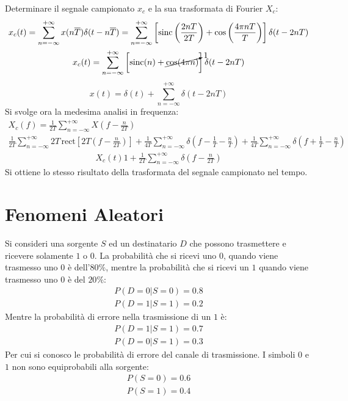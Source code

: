 \documentclass{article}
\newcommand{\rect}{\mbox{rect}}
\newcommand{\sinc}{\mbox{sinc}}
\begin{document}
Determinare il segnale campionato $x_c$ e la sua trasformata di Fourier $X_c$:
\begin{gather*}
    x_c(t)=\displaystyle\sum_{n=-\infty}^{+\infty}x(n\overline{T})\delta(t-n\overline{T})=\sum_{n=-\infty}^{+\infty}\left[\sinc\left(\frac{2nT}{2T}\right)+\cos\left(\frac{4\pi nT}{T}\right)\right]\delta(t-2nT)\\
    x_c(t)=\displaystyle\sum_{n=-\infty}^{+\infty}\left[\sinc(n)+\cancelto{1}{\cos(4\pi n)}\right]\delta(t-2nT)
\end{gather*}
\begin{equation}
    x(t)=\displaystyle\delta(t)+\sum_{n=-\infty}^{+\infty}\delta(t-2nT)
\end{equation}
Si svolge ora la medesima analisi in frequenza:
\begin{gather*}
    X_c(f)=\displaystyle\frac{1}{2T}\sum_{n=-\infty}^{+\infty}X\left(f-\frac{n}{2T}\right)\\
    \displaystyle\frac{1}{2T}\sum_{n=-\infty}^{+\infty}2T\,\rect\left[2T\left(f-\frac{n}{2T}\right)\right]+\frac{1}{4T}\sum_{n=-\infty}^{+\infty}\delta\left(f-\frac{1}{T}-\frac{n}{T}\right)+\frac{1}{4T}\sum_{n=-\infty}^{+\infty}\delta\left(f+\frac{1}{T}-\frac{n}{T}\right)
\end{gather*}
\begin{gather}
    X_c(t)1+\displaystyle\frac{1}{2T}\sum_{n=-\infty}^{+\infty}\delta\left(f-\frac{n}{2T}\right)
\end{gather}
Si ottiene lo stesso risultato della trasformata del segnale campionato nel tempo. 

\clearpage

\section{Fenomeni Aleatori}

Si consideri una sorgente $S$ ed un destinatario $D$ che possono trasmettere e ricevere solamente $1$ o $0$. La probabilità che si ricevi uno $0$, 
quando viene trasmesso uno $0$ è dell'$80\%$, mentre la probabilità che si ricevi un $1$ quando viene trasmesso uno $0$ è del $20\%$:
\begin{gather*}
    P(D=0|S=0)=0.8\\
    P(D=1|S=1)=0.2
\end{gather*}
Mentre la probabilità di errore nella trasmissione di un $1$ è:
\begin{gather*}
    P(D=1|S=1)=0.7\\
    P(D=0|S=1)=0.3
\end{gather*}
Per cui si conosco le probabilità di errore del canale di trasmissione.
I simboli $0$ e $1$ non sono equiprobabili alla sorgente:
\begin{gather*}
    P(S=0)=0.6\\
    P(S=1)=0.4
\end{gather*}
\end{document}
